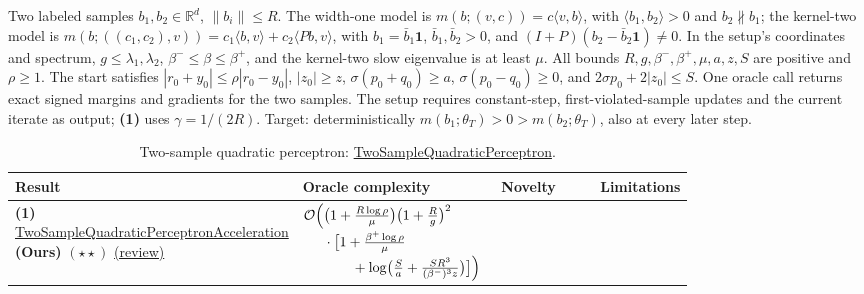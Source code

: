 \begin{table}[tp]
\centering
\caption{Two-sample quadratic perceptron: \href{https://github.com/k3nfalt/longtails/blob/main/LongTails/Setups/TwoSampleQuadraticPerceptron.lean}{TwoSampleQuadraticPerceptron}.}\label{tab:TwoSampleQuadraticPerceptron}
\parbox{\linewidth}{\footnotesize Two labeled samples $b_1,b_2\in\mathbb R^d$, $\|b_i\|\le R$. The width-one model is $m(b;(v,c))=c\langle v,b\rangle$, with $\langle b_1,b_2\rangle>0$ and $b_2\not\parallel b_1$; the kernel-two model is $m(b;((c_1,c_2),v))=c_1\langle b,v\rangle+c_2\langle Pb,v\rangle$, with $b_1=\bar b_1\mathbf1$, $\bar b_1,\bar b_2>0$, and $(I+P)(b_2-\bar b_2\mathbf1)\ne0$. In the setup's coordinates and spectrum, $g\le\lambda_1,\lambda_2$, $\beta^-\le\beta\le\beta^+$, and the kernel-two slow eigenvalue is at least $\mu$. All bounds $R,g,\beta^-,\beta^+,\mu,a,z,S$ are positive and $\rho\ge1$. The start satisfies $|r_0+y_0|\le\rho|r_0-y_0|$, $|z_0|\ge z$, $\sigma(p_0+q_0)\ge a$, $\sigma(p_0-q_0)\ge0$, and $2\sigma p_0+2|z_0|\le S$. One oracle call returns exact signed margins and gradients for the two samples. The setup requires constant-step, first-violated-sample updates and the current iterate as output; \textbf{(1)} uses $\gamma=1/(2R)$. Target: deterministically $m(b_1;\theta_T)>0>m(b_2;\theta_T)$, also at every later step.}\par\smallskip
\begin{threeparttable}
\footnotesize
\setlength{\tabcolsep}{4pt}\renewcommand{\arraystretch}{1.25}
\begin{tabularx}{\linewidth}{@{}>{\raggedright\arraybackslash}p{0.20\linewidth}>{\raggedright\arraybackslash}p{0.32\linewidth}>{\raggedright\arraybackslash}p{0.27\linewidth}>{\raggedright\arraybackslash}X@{}}
\toprule
\textbf{Result} & \textbf{Oracle complexity} & \textbf{Novelty} & \textbf{Limitations} \\
\midrule
\textbf{(1)} \href{https://github.com/k3nfalt/longtails/blob/main/LongTails/Theorems/TwoSampleQuadraticPerceptronAcceleration.lean}{Two\allowbreak Sample\allowbreak Quadratic\allowbreak Perceptron\allowbreak Acceleration} \textbf{(Ours)} $(\star\star)$ \href{https://github.com/k3nfalt/longtails/blob/main/scripts/reviews/TwoSampleQuadraticPerceptronAcceleration.md}{(review)}
& $\begin{aligned}[t]\mathcal{O}\Bigl(&\bigl(1+\tfrac{R\log\rho}{\mu}\bigr)\bigl(1+\tfrac Rg\bigr)^2\\[-2pt]&\cdot\bigl[1+\tfrac{\beta^+\log\rho}{\mu}\\[-2pt]&\qquad+\log\bigl(\tfrac Sa+\tfrac{SR^3}{(\beta^-)^3z}\bigr)\bigr]\Bigr)\end{aligned}$ & & \\

\end{tabularx}
\end{threeparttable}
\end{table}
